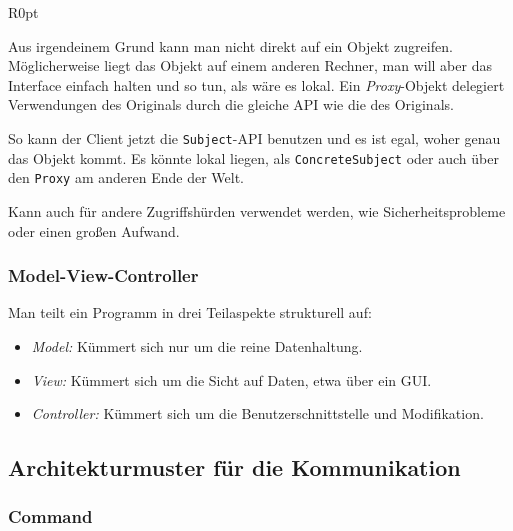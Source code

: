 \documentclass{panikzettel}
\begin{document}
\begin{wrapfigure}[12]{R}{0pt}
\end{wrapfigure}

Aus irgendeinem Grund kann man nicht direkt auf ein Objekt zugreifen.
Möglicherweise liegt das Objekt auf einem anderen Rechner, man will aber das Interface einfach halten und so tun, als wäre es lokal.
Ein \emph{Proxy}-Objekt delegiert Verwendungen des Originals durch die gleiche API wie die des Originals.

So kann der Client jetzt die \lstinline{Subject}-API benutzen und es ist egal, woher genau das Objekt kommt.
Es könnte lokal liegen, als \lstinline{ConcreteSubject} oder auch über den \lstinline{Proxy} am anderen Ende der Welt.

Kann auch für andere Zugriffshürden verwendet werden, wie Sicherheitsprobleme oder einen großen Aufwand.

\subsubsection{Model-View-Controller}

Man teilt ein Programm in drei Teilaspekte strukturell auf: \begin{itemize}
\item \emph{Model:} Kümmert sich nur um die reine Datenhaltung.
\item \emph{View:} Kümmert sich um die Sicht auf Daten, etwa über ein GUI.
\item \emph{Controller:} Kümmert sich um die Benutzerschnittstelle und Modifikation. %
\end{itemize}

\subsection{Architekturmuster für die Kommunikation}

\subsubsection{Command}
\end{document}
